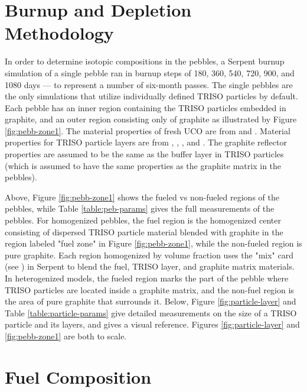 \section{Burnup and Depletion Methodology}
\label{meth-burn}
In order to determine isotopic compositions in the pebbles, a Serpent burnup simulation of a single pebble ran in burnup steps of 180, 360, 540, 720, 900, and 1080 days --- to represent a number of six-month passes.  The single pebbles are the only simulations that utilize individually defined TRISO particles by default.  Each pebble has an inner region containing the TRISO particles embedded in graphite, and an outer region consisting only of graphite as illustrated by Figure \ref{fig:pebb-zone1}.  The material properties of fresh UCO are from \cite{helmreich_year_2017} and \cite{nagley_fabrication_2010}.  Material properties for TRISO particle layers are from \cite{accuratus_silicon_2013}, \cite{espi_metals_graphite-pyrolytic_2019}, \cite{ho_graphite_1988}, and \cite{johnson_properties_1976}.  The graphite reflector properties are assumed to be the same as the buffer layer in TRISO particles (which is assumed to have the same properties as the graphite matrix in the pebbles).



Above, Figure \ref{fig:pebb-zone1} shows the fueled vs non-fueled regions of the pebbles, while Table \ref{table:peb-params} gives the full measurements of the pebbles.  For homogenized pebbles, the fuel region is the homogenized center consisting of dispersed TRISO particle material blended with graphite in the region labeled "fuel zone" in Figure \ref{fig:pebb-zone1}, while the non-fueled region is pure graphite.  Each region homogenized by volume fraction uses the "mix" card (see \cite{leppanenjaakko_serpent_2015}) in Serpent to blend the fuel, TRISO layer, and graphite matrix materials.  In heterogenized models, the fueled region marks the part of the pebble where TRISO particles are located inside a graphite matrix, and the non-fuel region is the area of pure graphite that surrounds it.  Below, Figure \ref{fig:particle-layer} and Table \ref{table:particle-params} give detailed measurements on the size of a TRISO particle and its layers, and gives a visual reference.  Figures \ref{fig:particle-layer} and \ref{fig:pebb-zone1} are both to scale.



\section{Fuel Composition}
\label{meth-comp}

